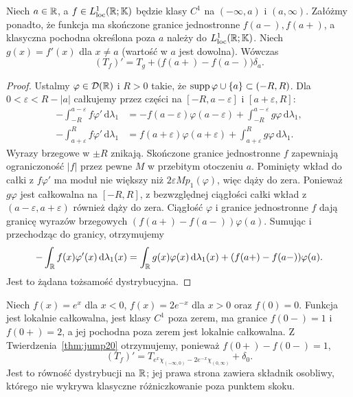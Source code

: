 \begin{twierdzenie}
\label{thm:jump20}
Niech $a\in\mathbb R$, a $f\in L^1_{\mathrm{loc}}(\mathbb R;\mathbb K)$ będzie
klasy $C^1$ na $(-\infty,a)$ i $(a,\infty)$. Załóżmy ponadto,
że funkcja ma skończone granice jednostronne
$f(a-),f(a+)$, a klasyczna pochodna określona poza $a$
należy do $L^1_{\mathrm{loc}}(\mathbb R;\mathbb K)$.
Niech $g(x)=f'(x)$ dla $x\ne a$ (wartość w $a$ jest dowolna).
Wówczas
\[
 (T_f)'=T_g+\bigl(f(a+)-f(a-)\bigr)\delta_a.
\]
\end{twierdzenie}
\begin{proof}
Ustalmy $\varphi\in\mathcal D(\mathbb R)$ i $R>0$ takie, że
$\operatorname{supp}\varphi\cup\{a\}\subset(-R,R)$.
Dla $0<\varepsilon<R-|a|$ całkujemy przez części na
$[-R,a-\varepsilon]$ i $[a+\varepsilon,R]$:
\[
\begin{aligned}
-\int_{-R}^{a-\varepsilon}f\varphi'\,\mathrm d\lambda_1
&=-f(a-\varepsilon)\varphi(a-\varepsilon)
 +\int_{-R}^{a-\varepsilon}g\varphi\,\mathrm d\lambda_1,\\
-\int_{a+\varepsilon}^Rf\varphi'\,\mathrm d\lambda_1
&= f(a+\varepsilon)\varphi(a+\varepsilon)
 +\int_{a+\varepsilon}^Rg\varphi\,\mathrm d\lambda_1.
\end{aligned}
\]
Wyrazy brzegowe w $\pm R$ znikają.
Skończone granice jednostronne $f$ zapewniają ograniczoność
$|f|$ przez pewne $M$ w przebitym otoczeniu $a$.
Pominięty wkład do całki z $f\varphi'$ ma moduł
nie większy niż $2\varepsilon M p_1(\varphi)$,
więc dąży do zera.
Ponieważ $g\varphi$ jest całkowalna na $[-R,R]$,
z bezwzględnej ciągłości całki wkład z
$(a-\varepsilon,a+\varepsilon)$ również dąży do zera.
Ciągłość $\varphi$ i granice jednostronne $f$ dają
granicę wyrazów brzegowych
$(f(a+)-f(a-))\varphi(a)$.
Sumując i przechodząc do granicy, otrzymujemy
\[
 -\int_\mathbb R f(x)\varphi'(x)\,\mathrm d\lambda_1(x)
 =\int_\mathbb R g(x)\varphi(x)\,\mathrm d\lambda_1(x)
 +(f(a+)-f(a-))\varphi(a).
\]
Jest to żądana tożsamość dystrybucyjna.
\end{proof}

\begin{przyklad}
\label{ex:piecewise20}
Niech $f(x)=e^x$ dla $x<0$, $f(x)=2e^{-x}$ dla $x>0$
oraz $f(0)=0$. Funkcja jest lokalnie całkowalna,
jest klasy $C^1$ poza zerem, ma granice $f(0-)=1$ i $f(0+)=2$,
a jej pochodna poza zerem jest lokalnie całkowalna.
Z Twierdzenia~\ref{thm:jump20} otrzymujemy, ponieważ
$f(0+)-f(0-)=1$,
\[
 (T_f)'=T_{e^x\chi_{(-\infty,0)}
 -2e^{-x}\chi_{(0,\infty)}}+\delta_0.
\]
Jest to równość dystrybucji na $\mathbb R$; jej prawa strona
zawiera składnik osobliwy, którego nie wykrywa klasyczne
różniczkowanie poza punktem skoku.
\end{przyklad}

